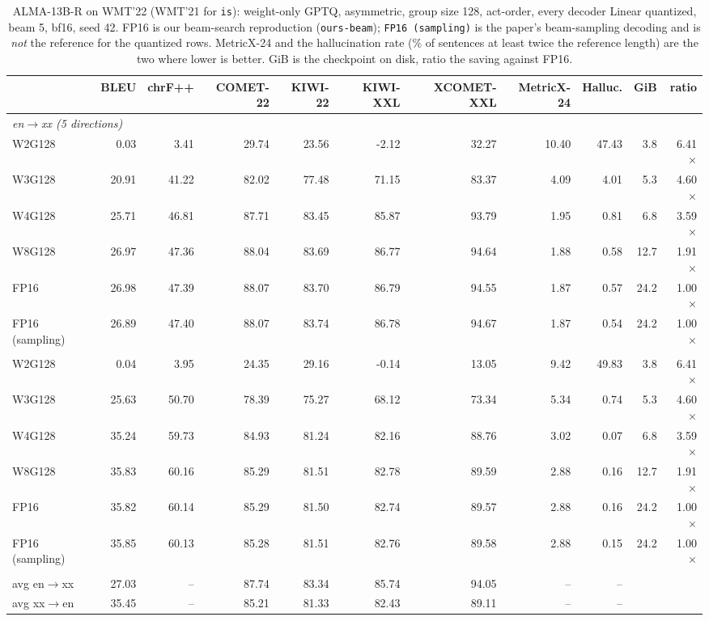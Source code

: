 \begin{table}[t]
\centering
\footnotesize
\setlength{\tabcolsep}{4pt}
\begin{tabular}{lrrrrrrrrrr}
\toprule
& BLEU & chrF++ & COMET-22 & KIWI-22 & KIWI-XXL & XCOMET-XXL & MetricX-24 & Halluc. & GiB & ratio \\
\midrule
\multicolumn{11}{l}{\emph{en$\rightarrow$xx (5 directions)}} \\
W2G128 & 0.03 & 3.41 & 29.74 & 23.56 & -2.12 & 32.27 & 10.40 & 47.43 & 3.8 & 6.41$\times$ \\
W3G128 & 20.91 & 41.22 & 82.02 & 77.48 & 71.15 & 83.37 & 4.09 & 4.01 & 5.3 & 4.60$\times$ \\
W4G128 & 25.71 & 46.81 & 87.71 & 83.45 & 85.87 & 93.79 & 1.95 & 0.81 & 6.8 & 3.59$\times$ \\
W8G128 & 26.97 & 47.36 & 88.04 & 83.69 & 86.77 & 94.64 & 1.88 & 0.58 & 12.7 & 1.91$\times$ \\
FP16 & 26.98 & 47.39 & 88.07 & 83.70 & 86.79 & 94.55 & 1.87 & 0.57 & 24.2 & 1.00$\times$ \\
FP16 (sampling) & 26.89 & 47.40 & 88.07 & 83.74 & 86.78 & 94.67 & 1.87 & 0.54 & 24.2 & 1.00$\times$ \\
\addlinespace
\multicolumn{11}{l}{\emph{xx$\rightarrow$en (5 directions)}} \\
W2G128 & 0.04 & 3.95 & 24.35 & 29.16 & -0.14 & 13.05 & 9.42 & 49.83 & 3.8 & 6.41$\times$ \\
W3G128 & 25.63 & 50.70 & 78.39 & 75.27 & 68.12 & 73.34 & 5.34 & 0.74 & 5.3 & 4.60$\times$ \\
W4G128 & 35.24 & 59.73 & 84.93 & 81.24 & 82.16 & 88.76 & 3.02 & 0.07 & 6.8 & 3.59$\times$ \\
W8G128 & 35.83 & 60.16 & 85.29 & 81.51 & 82.78 & 89.59 & 2.88 & 0.16 & 12.7 & 1.91$\times$ \\
FP16 & 35.82 & 60.14 & 85.29 & 81.50 & 82.74 & 89.57 & 2.88 & 0.16 & 24.2 & 1.00$\times$ \\
FP16 (sampling) & 35.85 & 60.13 & 85.28 & 81.51 & 82.76 & 89.58 & 2.88 & 0.15 & 24.2 & 1.00$\times$ \\
\addlinespace
\midrule
\multicolumn{11}{l}{\emph{ALMA-R paper (reported, their decoding)}} \\
avg en$\rightarrow$xx & 27.03 & -- & 87.74 & 83.34 & 85.74 & 94.05 & -- & -- & & \\
avg xx$\rightarrow$en & 35.45 & -- & 85.21 & 81.33 & 82.43 & 89.11 & -- & -- & & \\
\bottomrule
\end{tabular}
\caption{ALMA-13B-R on WMT'22 (WMT'21 for \texttt{is}): weight-only GPTQ, asymmetric, group size 128, act-order, every decoder Linear quantized, beam 5, bf16, seed 42. FP16 is our beam-search reproduction (\texttt{ours-beam}); \texttt{FP16 (sampling)} is the paper's beam-sampling decoding and is \emph{not} the reference for the quantized rows. MetricX-24 and the hallucination rate (\% of sentences at least twice the reference length) are the two where lower is better. GiB is the checkpoint on disk, ratio the saving against FP16.}
\label{tab:grid-avg}
\end{table}

